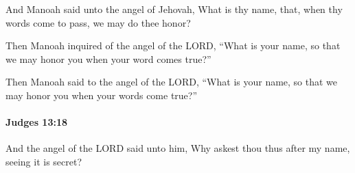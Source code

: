 			\begin{versebox}
					\item[BHS] 
					\item[ASV] And Manoah said unto the angel of Jehovah, What is thy name, that, when thy words come to pass, we may do thee honor?
					\item[NIV] Then Manoah inquired of the angel of the LORD, “What is your name, so that we may honor you when your word comes true?”
					\item[NRSV] Then Manoah said to the angel of the LORD, “What is your name, so that we may honor you when your words come true?”
			\end{versebox}

		\paragraph{Judges 13:18} %
			\label{JUDGES-13-18}

			And the angel of the LORD said unto him, Why askest thou thus after my name, seeing it is secret?

